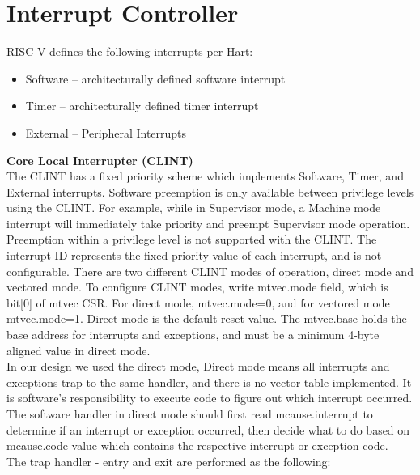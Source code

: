 \documentclass[../main.tex]{subfiles}
\begin{document}
    
\section{Interrupt Controller}
RISC-V defines the following interrupts per Hart:
\begin{itemize}
    \item Software – architecturally defined software interrupt
    \item Timer – architecturally defined timer interrupt
    \item External – Peripheral Interrupts
\end{itemize}
\textbf{Core Local Interrupter (CLINT)}\\
The CLINT has a fixed priority scheme which implements Software, Timer, and External interrupts. Software preemption is only available between privilege levels using the CLINT. For example, while in Supervisor mode, a Machine mode interrupt will immediately take priority and preempt Supervisor mode operation. Preemption within a privilege level is not supported with the CLINT. The interrupt ID represents the fixed priority value of each interrupt, and is not configurable. There are two different CLINT modes of operation, direct mode and vectored mode. To configure CLINT modes, write mtvec.mode field, which is bit[0] of mtvec CSR. For direct mode, mtvec.mode=0, and for vectored mode mtvec.mode=1. Direct mode is the default reset value. The mtvec.base holds the base address for interrupts and exceptions, and must be a minimum 4-byte aligned value in direct mode.\\
In our design we used the direct mode, Direct mode means all interrupts and exceptions trap to the same handler, and there is no vector table implemented. It is software’s responsibility to execute code to figure out which interrupt occurred. The software handler in direct mode should first read mcause.interrupt to determine if an interrupt or exception occurred, then decide what to do based on mcause.code value which contains the respective interrupt or exception code.\\
\newline
\noindent The trap handler - entry and exit are performed as the following:
\end{document}
